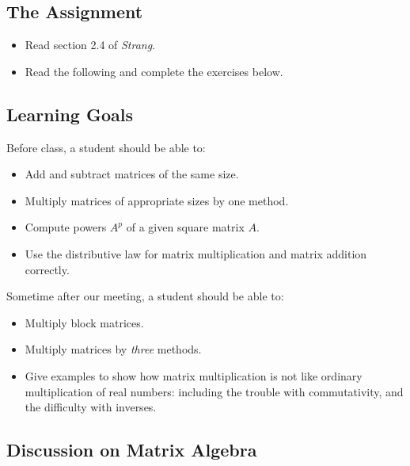 \documentclass[10pt,]{book}
\theoremstyle{plain}
\theoremstyle{definition}
\numberwithin{equation}{section}
\begin{document}
\subsection[The Assignment]{The Assignment}\label{subsection-36}
\begin{itemize}
\item{}Read section 2.4 of \emph{Strang}.\item{}Read the following and complete the exercises below.\end{itemize}
\typeout{************************************************}
\typeout{************************************************}
\subsection[Learning Goals]{Learning Goals}\label{subsection-37}

      Before class, a student should be able to:
\begin{itemize}
\item{}Add and subtract matrices of the same size.\item{}Multiply matrices of appropriate sizes by one method.\item{}Compute powers \(A^p\) of a given square matrix \(A\).\item{}Use the distributive law for matrix multiplication and matrix addition correctly.\end{itemize}
\par

      Sometime after our meeting, a student should be able to:
\begin{itemize}
\item{}Multiply block matrices.\item{}Multiply matrices by \emph{three} methods.\item{}Give examples to show how matrix multiplication is not like
        ordinary multiplication of real numbers: including the trouble
        with commutativity, and the difficulty with inverses.
      \end{itemize}
\typeout{************************************************}
\typeout{************************************************}
\subsection[Discussion on Matrix Algebra]{Discussion on Matrix Algebra}\label{subsection-38}
\end{document}
